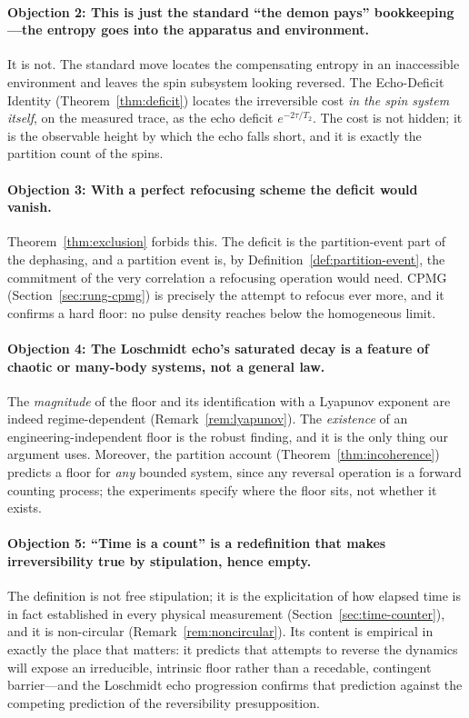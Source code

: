 \documentclass[11pt,a4paper]{article}
\theoremstyle{thmstyle}
\theoremstyle{definition}
\theoremstyle{remark}
\newcommand{\Ttwo}{T_{2}}
\begin{document}
\paragraph{Objection 2: This is just the standard ``the demon pays''
bookkeeping---the entropy goes into the apparatus and environment.} It is
not. The standard move locates the compensating entropy in an
inaccessible environment and leaves the spin subsystem looking reversed.
The Echo-Deficit Identity (Theorem~\ref{thm:deficit}) locates the
irreversible cost \emph{in the spin system itself}, on the measured trace,
as the echo deficit $e^{-2\tau/\Ttwo}$. The cost is not hidden; it is the
observable height by which the echo falls short, and it is exactly the
partition count of the spins.

\paragraph{Objection 3: With a perfect refocusing scheme the deficit
would vanish.} Theorem~\ref{thm:exclusion} forbids this. The deficit is
the partition-event part of the dephasing, and a partition event is, by
Definition~\ref{def:partition-event}, the commitment of the very
correlation a refocusing operation would need. CPMG
(Section~\ref{sec:rung-cpmg}) is precisely the attempt to refocus ever
more, and it confirms a hard floor: no pulse density reaches below the
homogeneous limit.

\paragraph{Objection 4: The Loschmidt echo's saturated decay is a feature
of chaotic or many-body systems, not a general law.} The
\emph{magnitude} of the floor and its identification with a Lyapunov
exponent are indeed regime-dependent (Remark~\ref{rem:lyapunov}). The
\emph{existence} of an engineering-independent floor is the robust
finding, and it is the only thing our argument uses. Moreover, the
partition account (Theorem~\ref{thm:incoherence}) predicts a floor for
\emph{any} bounded system, since any reversal operation is a forward
counting process; the experiments specify where the floor sits, not
whether it exists.

\paragraph{Objection 5: ``Time is a count'' is a redefinition that makes
irreversibility true by stipulation, hence empty.} The definition is not
free stipulation; it is the explicitation of how elapsed time is in fact
established in every physical measurement (Section~\ref{sec:time-counter}),
and it is non-circular (Remark~\ref{rem:noncircular}). Its content is
empirical in exactly the place that matters: it predicts that attempts to
reverse the dynamics will expose an irreducible, intrinsic floor rather
than a recedable, contingent barrier---and the Loschmidt echo progression
confirms that prediction against the competing prediction of the
reversibility presupposition.
\end{document}

